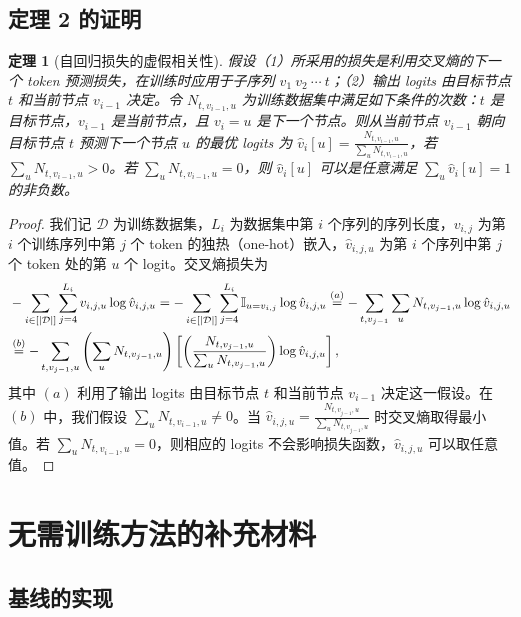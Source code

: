 \documentclass[11pt,UTF8,fontset=fandol]{ctexart}
\newtheorem{theorem}{定理}
\begin{document}
\subsection{定理 2 的证明}

\begin{theorem}[自回归损失的虚假相关性]
假设（1）所采用的损失是利用交叉熵的下一个 token 预测损失，在训练时应用于子序列 $v_1\ v_2\ \cdots\ t$；（2）输出 logits 由目标节点 $t$ 和当前节点 $v_{i-1}$ 决定。令 $N_{t,v_{i-1},u}$ 为训练数据集中满足如下条件的次数：$t$ 是目标节点，$v_{i-1}$ 是当前节点，且 $v_i = u$ 是下一个节点。则从当前节点 $v_{i-1}$ 朝向目标节点 $t$ 预测下一个节点 $u$ 的最优 logits 为 $\hat{v}_i[u] = \frac{N_{t,v_{i-1},u}}{\sum_u N_{t,v_{i-1},u}}$，若 $\sum_u N_{t,v_{i-1},u} > 0$。若 $\sum_u N_{t,v_{i-1},u} = 0$，则 $\hat{v}_i[u]$ 可以是任意满足 $\sum_u \hat{v}_i[u] = 1$ 的非负数。
\end{theorem}

\begin{proof}
我们记 $\mathcal{D}$ 为训练数据集，$L_i$ 为数据集中第 $i$ 个序列的序列长度，$v_{i,j}$ 为第 $i$ 个训练序列中第 $j$ 个 token 的独热（one-hot）嵌入，$\hat{v}_{i,j,u}$ 为第 $i$ 个序列中第 $j$ 个 token 处的第 $u$ 个 logit。交叉熵损失为
\begin{align}
&-\sum_{i\in[|\mathcal{D}|]}\sum_{j=4}^{L_i} v_{i,j,u}\log\hat{v}_{i,j,u}
= -\sum_{i\in[|\mathcal{D}|]}\sum_{j=4}^{L_i} \mathbb{I}_{u=v_{i,j}}\log\hat{v}_{i,j,u}
\overset{(a)}{=} -\sum_{t,v_{j-1}}\sum_u N_{t,v_{j-1},u}\log\hat{v}_{i,j,u}\notag\\
&\overset{(b)}{=} -\sum_{t,v_{j-1},u}\left(\sum_u N_{t,v_{j-1},u}\right)\left[\left(\frac{N_{t,v_{j-1},u}}{\sum_u N_{t,v_{j-1},u}}\right)\log\hat{v}_{i,j,u}\right],\notag
\end{align}
其中 $(a)$ 利用了输出 logits 由目标节点 $t$ 和当前节点 $v_{i-1}$ 决定这一假设。在 $(b)$ 中，我们假设 $\sum_u N_{t,v_{i-1},u}\neq 0$。当 $\hat{v}_{i,j,u} = \frac{N_{t,v_{j-1},u}}{\sum_u N_{t,v_{j-1},u}}$ 时交叉熵取得最小值。若 $\sum_u N_{t,v_{i-1},u} = 0$，则相应的 logits 不会影响损失函数，$\hat{v}_{i,j,u}$ 可以取任意值。
\end{proof}

\section{无需训练方法的补充材料}
\subsection{基线的实现}
\end{document}
